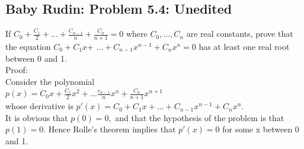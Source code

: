 \subsection*{Baby Rudin: Problem 5.4: Unedited}
If $C_{0}+\frac{C_{1}}{2}+\dots +\frac{C_{n-1}}{n}+\frac{C_n}{n+1}=0$ where $C_0, \dots, C_n$ are real constants, prove that the equation $C_{0}+C_{1}x$+ $\dots + C_{n-1}x^{n-1}+C_{n}x^{n}=0$ has at least one real root between 0 and 1. \\ 
Proof: \\ 
Consider the polynomial \\ 
$p(x)=C_{0}x+\frac{C_1}{2}x^2+\dots \frac{c_{n-1}}{n}x^n+ \frac{C_{n}}{n+1}x^{n+1}$\\ 
whose derivative is $p'(x)=C_{0}+C_{1}x+\dots +C_{n-1}x^{n-1}+C_{n}x^{n}.$\\
It is obvious that $p(0)=0,$ and that the hypothesis of the problem is that $p(1)=0$. Hence Rolle's theorem implies that $p'(x)=0$ for some x between 0 and 1. 


\section{}